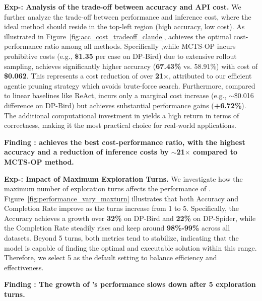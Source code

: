 \noindent \textbf{Exp-\expnum\label{exp:acc_cost_tradeoff}: Analysis of the trade-off between accuracy and API cost.}
We further analyze the trade-off between performance and inference cost, where the ideal method should reside in the top-left region (high accuracy, low cost).
As illustrated in Figure~\ref{fig:acc_cost_tradeoff_claude}, \sysp achieves the optimal cost-performance ratio among all methods.
Specifically ,while MCTS-OP incurs prohibitive costs (e.g., \textbf{\$1.35} per case on DP-Bird) due to extensive rollout sampling, \sysp achieves significantly higher accuracy (\textbf{67.43\%} vs. 58.91\%) with cost of \textbf{\$0.062}. This represents a cost reduction of over \textbf{21$\times$}, attributed to our efficient agentic pruning strategy which avoids brute-force search. 
Furthermore, compared to linear baselines like ReAct, \sysp incurs only a marginal cost increase (e.g., $\sim$\$0.016 difference on DP-Bird) but achieves substantial performance gains (\textbf{+6.72\%}). 
The additional computational investment in \sysp yields a high return in terms of correctness, making it the most practical choice for real-world applications.

\begin{shaded}
\noindent \textbf{Finding \findingnum: \sysp achieves the best cost-performance ratio, with the highest accuracy and a reduction of inference costs by $\sim$21$\times$ compared to MCTS-OP method.}
\end{shaded}



\noindent \textbf{Exp-\expnum\label{exp:turn_number_influence}: Impact of Maximum Exploration Turns.}
We investigate how the maximum number of exploration turns affects the performance of \sysp. Figure~\ref{fig:performance_vary_maxturn} illustrates that both Accuracy and Completion Rate improve as the turns increase from 1 to 5.
Specifically, the Accuracy achieves a growth over \textbf{32\%} on DP-Bird and \textbf{22\%} on DP-Spider, while the Completion Rate steadily rises and keep around \textbf{98\%-99\%} across all datasets.
Beyond 5 turns, both metrics tend to stabilize, indicating that the model is capable of finding the optimal and executable solution within this range.
Therefore, we select 5 as the default setting to balance efficiency and effectiveness.

\begin{shaded}
\noindent \textbf{Finding \findingnum: The growth of \sysp's performance slows down after 5 exploration turns.}
\end{shaded}